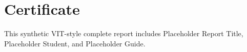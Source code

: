\documentclass{vit-report}
\newcommand{\thesistitle}{Placeholder Report Title}
\newcommand{\studentAname}{Placeholder Student}
\newcommand{\projguidename}{Placeholder Guide}
\begin{document}
\maketitle
\chapter*{Certificate}
This synthetic VIT-style complete report includes \thesistitle, \studentAname, and \projguidename.

\end{document}
